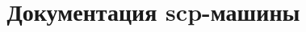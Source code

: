 \documentclass{scndocument}
\begin{document}
	
	
	\DeactivateBG
	\title{\centering Документация scp-машины}
	\maketitle
	
	\normalsize
	
	\setcounter{page}{2}
	
	\ActivateBG
		
\end{document}
